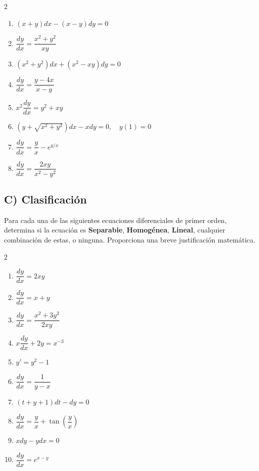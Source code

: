 \documentclass[a4paper,11pt]{article}
\begin{document}
\begin{multicols}{2}
\begin{enumerate}[itemsep=0.1cm]
    \item $(x+y)dx - (x-y)dy = 0$
    \item $\dfrac{dy}{dx} = \dfrac{x^2 + y^2}{xy}$
    \item $(x^2+y^2)dx + (x^2-xy)dy = 0$
    \item $\dfrac{dy}{dx} = \dfrac{y-4x}{x-y}$
    \item $x^2 \dfrac{dy}{dx} = y^2 + xy$
    \item $(y + \sqrt{x^2+y^2})dx - x dy = 0, \quad y(1) = 0$
    \item $\dfrac{dy}{dx} = \dfrac{y}{x} - e^{y/x}$
    \item $\dfrac{dy}{dx} = \dfrac{2xy}{x^2 - y^2}$
\end{enumerate}
\end{multicols}

\subsection*{C) Clasificación}
Para cada una de las siguientes ecuaciones diferenciales de primer orden, determina si la ecuación es \textbf{Separable}, \textbf{Homogénea}, \textbf{Lineal}, cualquier combinación de estas, o ninguna. Proporciona una breve justificación matemática.

\begin{multicols}{2}
\begin{enumerate}[itemsep=0.1cm]
    \item $\dfrac{dy}{dx} = 2xy$
    \item $\dfrac{dy}{dx} = x + y$
    \item $\dfrac{dy}{dx} = \dfrac{x^2 + 3y^2}{2xy}$
    \item $x \dfrac{dy}{dx} + 2y = x^{-3}$
    \item $y' = y^2 - 1$
    \item $\dfrac{dy}{dx} = \dfrac{1}{y-x}$
    \item $(t+y+1)dt - dy = 0$
    \item $\dfrac{dy}{dx} = \dfrac{y}{x} + \tan\left(\dfrac{y}{x}\right)$
    \item $x dy - y dx = 0$
    \item $\dfrac{dy}{dx} = e^{x-y}$
\end{enumerate}
\end{multicols}
\end{document}
